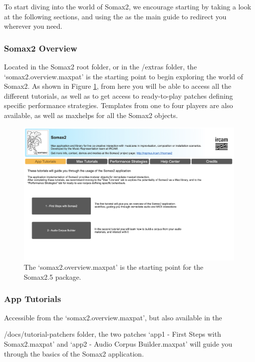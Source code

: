 \noindent To start diving into the world of Somax2, we encourage starting by taking a look at the following sections, and using the  as the main guide to redirect you wherever you need.

\subsubsection{Somax2 Overview}

Located in the Somax2 root folder, or in the /extras folder, the `somax2.overview.maxpat' is the starting point to begin exploring the  world of Somax2. 
As shown in Figure \ref{fig:overview}, from here you will be able to access all the different tutorials, as well as to get access to ready-to-play patches defining specific performance strategies. Templates from one to four players are also available, as well as maxhelps for all the Somax2 objects.

 \begin{figure}[h!]
    \centering        
 	\includegraphics[width=1\textwidth, keepaspectratio]{img/somax2_overview.png}
    \caption{The `somax2.overview.maxpat' is the starting point for the Somax2.5 package.}
    \label{fig:overview}
\end{figure}

\subsubsection{App Tutorials}

Accessible from the `somax2.overview.maxpat', but also available in the 

/docs/tutorial-patchers folder, the two patches `app1 - First Steps with Somax2.maxpat' and `app2 - Audio Corpus Builder.maxpat' will guide you through the basics of the Somax2 application.

